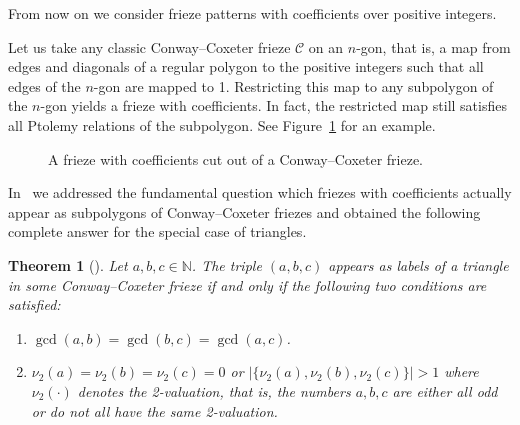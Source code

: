 \documentclass[10pt]{amsart}
\numberwithin{equation}{section}
\newtheorem{theo}{Theorem}[section]
\theoremstyle{definition}
\theoremstyle{remark}
\begin{document}
From now on we consider frieze patterns with coefficients over positive integers. 

Let us take any classic Conway--Coxeter 
frieze $\mathcal{C}$ on an $n$-gon, that is, a map
from edges and diagonals of a regular
polygon to the positive integers such that all edges of the $n$-gon are mapped to 1.
Restricting this map to any subpolygon of the
$n$-gon yields a frieze with coefficients. In fact,
the restricted
map still satisfies all Ptolemy relations of the subpolygon. See Figure~\ref{fig:cut}
for an example. 

\begin{figure}[htb]\centering
\mbox{\hskip2cm}
 \caption{A frieze with coefficients cut out of a Conway--Coxeter frieze. 
 \label{fig:cut}}
\end{figure}


In~\cite{CHJ} we addressed the fundamental question which friezes with coefficients 
actually appear as subpolygons of Conway--Coxeter friezes and obtained the 
following complete answer for the special case of triangles.


\begin{theo}[{\cite[Theorem~5.12]{CHJ}}] \label{thm:triangle}
Let $a,b,c\in \mathbb{N}$. The triple $(a,b,c)$ appears as labels of a triangle
in some Conway--Coxeter frieze if and only if the following two conditions are
satisfied:
\begin{enumerate}
\item $\gcd(a,b)=\gcd(b,c)=\gcd(a,c)$.
\item $\nu_2(a)=\nu_2(b)=\nu_2(c)=0$ or $|\{\nu_2(a),\nu_2(b),\nu_2(c)\}|>1$ where
$\nu_2(\cdot )$ denotes the 2-valuation, that is, the numbers $a,b,c$ are either all odd or 
do not all have the same 2-valuation.
\end{enumerate}
\end{theo}
\end{document}
